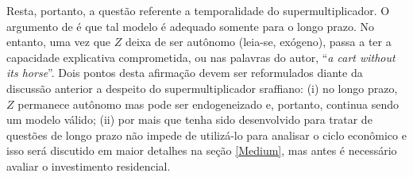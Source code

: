 Resta, portanto, a questão referente a temporalidade do supermultiplicador. O argumento de \citeauthor*{nikiforos_comments_2018} é que tal modelo é adequado somente para o longo prazo. No entanto, uma vez que $Z$ deixa de ser autônomo (leia-se, exógeno), passa a ter a capacidade explicativa comprometida, ou nas palavras do autor, ``\textit{a cart without its horse}''. 
Dois pontos desta afirmação devem ser reformulados diante da discussão anterior a despeito do supermultiplicador sraffiano: (i) no longo prazo, $Z$ permanece autônomo mas pode ser endogeneizado e, portanto, continua sendo um modelo válido; (ii) por mais que tenha sido desenvolvido para tratar de questões de longo prazo não impede de utilizá-lo para analisar o ciclo econômico e isso será discutido em maior detalhes na seção \ref{Medium}, mas antes é necessário avaliar o investimento residencial.

